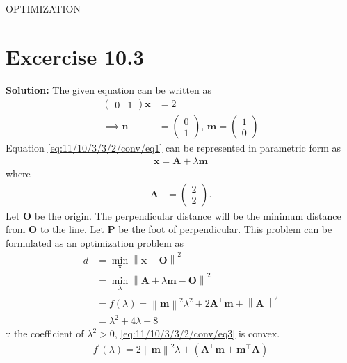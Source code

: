 \documentclass[12pt]{article}
\providecommand{\brak}[1]{\ensuremath{\left(#1\right)}}
\providecommand{\norm}[1]{\left\lVert#1\right\rVert}
\newcommand{\solution}{\noindent \textbf{Solution: }}
\newcommand{\myvec}[1]{\ensuremath{\begin{pmatrix}#1\end{pmatrix}}}
\let\vec\mathbf
\begin{document}
\begin{center}
\textbf\large{OPTIMIZATION}

\end{center}
\section*{Excercise 10.3}


\solution
\fi
The given equation can be written as
\begin{align}
	\label{eq:11/10/3/3/2/conv/eq1}
	\myvec{0&1}\vec{x} &= 2\\
\implies 	\vec{n} &= \myvec{0\\1},\,
	\vec{m} = \myvec{1\\0}
\end{align}
Equation \eqref{eq:11/10/3/3/2/conv/eq1} can be represented in parametric form as
\begin{align}
	\label{eq:11/10/3/3/2/conv/eq2}
	\vec{x} = \vec{A}+\lambda\vec{m}
\end{align}
where
\begin{align}
	\vec{A} &= \myvec{2\\2}.
	\label{eq:11/10/3/3/2/conv/line}
\end{align}
Let $\vec{O}$ be the origin. The perpendicular distance will be the minimum distance from $\vec{O}$ to the line. Let $\vec{P}$ be the foot of perpendicular. This problem can be formulated as an optimization problem as 
\begin{align}
	d &=  \min_{\vec{x}}\norm{\vec{x}-\vec{O}}^2\\
	&=\min_{\lambda}\norm{\vec{A}+\lambda\vec{m}-\vec{O}}^2\\
	&= f\brak{\lambda} = \norm{\vec{m}}^2\lambda^2+2\vec{A}^\top\vec{m}+\norm{\vec{A}}^2
	\label{eq:11/10/3/3/2/conv/eq3}
	\\
	&= \lambda^2+4\lambda+8
\end{align}
$\because$ the coefficient of $\lambda^2>0$, \eqref{eq:11/10/3/3/2/conv/eq3} is convex. 
\begin{align}
	\label{eq:11/10/3/3/2/conv/eq4}
	f^\prime\brak{\lambda} = 2\norm{\vec{m}}^2\lambda+\brak{\vec{A}^\top\vec{m}+\vec{m}^\top\vec{A}}
\end{align}
\end{document}
